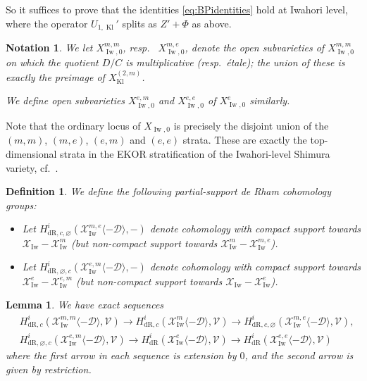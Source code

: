 \documentclass[cjm]{ipart}
\theoremstyle{plain}
\newtheorem{lemma}[theorem]{Lemma}
\newtheorem{definition}[theorem]{Definition}
\newtheorem{notation}[theorem]{Notation}
\theoremstyle{remark}
\DeclareMathOperator{\Iw}{Iw}
\DeclareMathOperator{\Kl}{Kl}
\newcommand{\cD}{\mathcal{D}}
\newcommand{\cV}{\mathcal{V}}
\newcommand{\cX}{\mathcal{X}}
\newcommand{\dR}{\mathrm{dR}}
\numberwithin{equation}{subsection}
\renewcommand{\emptyset}{\varnothing}
\begin{document}
  So it suffices to prove that the identities \eqref{eq:BPidentities} hold at Iwahori level, where the operator $U_{1, \Kl}'$ splits as $Z' + \Phi$ as above.

  \begin{notation}
   We let $X_{\Iw,0}^{m,m}$, resp.~ $X_{\Iw,0}^{m,e}$, denote the open subvarieties of $X_{\Iw,0}^{m, m}$ on which the quotient $D / C$ is multiplicative (resp.~\'etale); the union of these is exactly the preimage of $X_{\Kl}^{(2, m)}$.

   We define open subvarieties $X_{\Iw,0}^{e,m}$ and $X_{\Iw,0}^{e,e}$ of $X_{\Iw, 0}^e$ similarly.
  \end{notation}

  \begin{remark}
   Note that the ordinary locus of $X_{\Iw,0}$ is precisely the disjoint union of the $(m, m)$, $(m, e)$, $(e, m)$ and $(e, e)$ strata. These are exactly the top-dimensional strata in the EKOR stratification of the Iwahori-level Shimura variety, cf.~\cite[\S 6.3]{shenyuzhang21}.
  \end{remark}

  \begin{definition}
   We define the following partial-support de Rham cohomology groups:
   \begin{itemize}
   \item Let $H^i_{\dR,c,\varnothing}(\cX_{\Iw}^{m,e}\langle -\cD\rangle, -)$ denote cohomology with compact support towards $\cX_{\Iw} - \cX_{\Iw}^{m}$ (but non-compact support towards $\cX_{\Iw}^{m} - \cX_{\Iw}^{m,e}$).
   \item Let $H^i_{\dR,\emptyset, c}(\cX_{\Iw}^{e,m}\langle -\cD\rangle, -)$ denote cohomology with compact support towards $\cX_{\Iw}^e - \cX_{\Iw}^{e, m}$ (but non-compact support towards $\cX_{\Iw} - \cX_{\Iw}^{e}$).
   \end{itemize}
  \end{definition}

  \begin{lemma}
   \label{lem:BPexactseq}
   We have exact sequences
   \begin{align*}
    &H^i_{\dR,c} (\cX^{m,m}_{\Iw}\langle -\cD\rangle,\cV) \to
    H^i_{\dR, c}(\cX^m_{\Iw}\langle -\cD\rangle,\cV) \to H^i_{\dR,c,\emptyset}(\cX_{\Iw}^{m,e}\langle -\cD\rangle,\cV),\\
    &H^i_{\dR,\emptyset,c} (\cX^{e,m}_{\Iw}\langle -\cD\rangle,\cV)\to
    H^i_{\dR}(\cX^e_{\Iw}\langle -\cD\rangle,\cV)\to H^i_{\dR}(\cX_{\Iw}^{e,e}\langle -\cD\rangle,\cV)
   \end{align*}
   where the first arrow in each sequence is extension by $0$, and the second arrow is given by restriction.
  \end{lemma}
\end{document}
